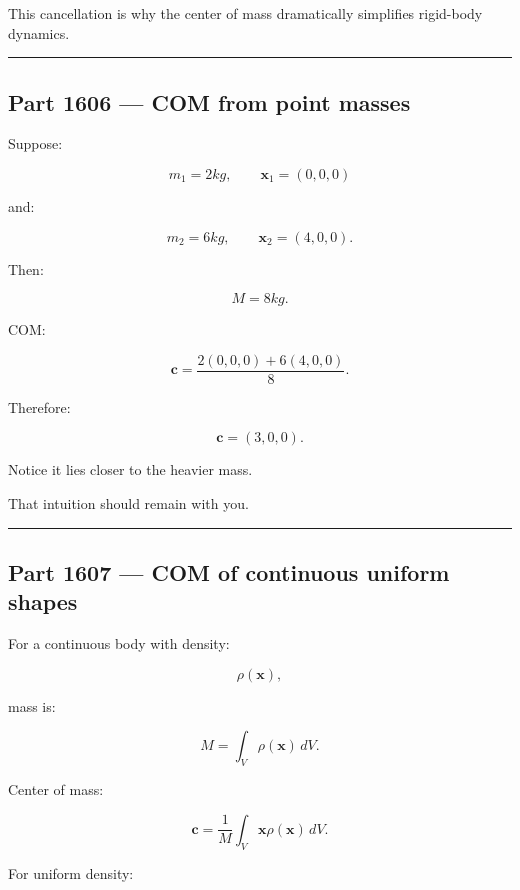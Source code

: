 This cancellation is why the center of mass dramatically simplifies rigid-body dynamics.

\begin{center}\rule{0.5\linewidth}{0.5pt}\end{center}

\subsection{Part 1606 --- COM from point masses}\label{06-engine-ii-ch034-part-1606-com-from-point-masses}

\hypertarget{06-engine-ii-ch034-part-1606-com-from-point-masses}{}

Suppose:

\[
m_1=2kg,\qquad
\mathbf{x}_1=(0,0,0)
\]

and:

\[
m_2=6kg,\qquad
\mathbf{x}_2=(4,0,0).
\]

Then:

\[
M=8kg.
\]

COM:

\[
\mathbf{c}
=
\frac{
2(0,0,0)+6(4,0,0)
}{8}.
\]

Therefore:

\[
\boxed{
\mathbf{c}=(3,0,0).
}
\]

Notice it lies closer to the heavier mass.

That intuition should remain with you.

\begin{center}\rule{0.5\linewidth}{0.5pt}\end{center}

\subsection{Part 1607 --- COM of continuous uniform shapes}\label{06-engine-ii-ch034-part-1607-com-of-continuous-uniform-shapes}

\hypertarget{06-engine-ii-ch034-part-1607-com-of-continuous-uniform-shapes}{}

For a continuous body with density:

\[
\rho(\mathbf{x}),
\]

mass is:

\[
M
=
\int_V
\rho(\mathbf{x})\,dV.
\]

Center of mass:

\[
\boxed{
\mathbf{c}
=
\frac{1}{M}
\int_V
\mathbf{x}\rho(\mathbf{x})\,dV.
}
\]

For uniform density:

